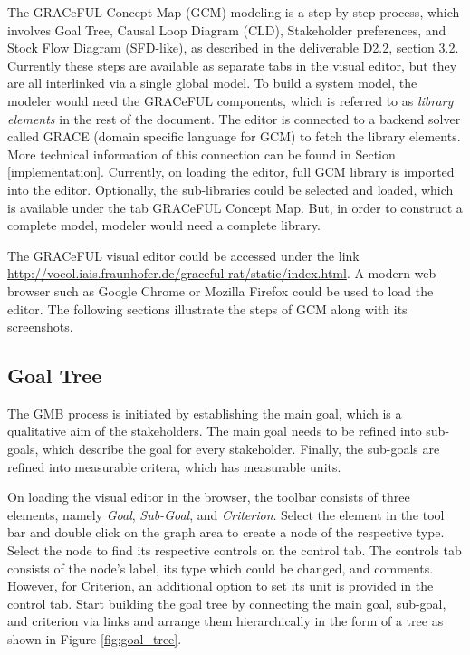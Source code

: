 \documentclass[a4paper]{article}
\begin{document}
The GRACeFUL Concept Map (GCM) modeling is a step-by-step process, which involves Goal Tree, Causal Loop Diagram (CLD), Stakeholder preferences, and Stock Flow Diagram (SFD-like), as described in the deliverable D2.2, section 3.2. Currently these steps are available as separate tabs in the visual editor, but they are all interlinked via a single global model. To build a system model, the modeler would need the GRACeFUL components, which is referred to as \textit{library elements} in the rest of the document. The editor is connected to a backend solver called GRACE (domain specific language for GCM) to fetch the library elements. More technical information of this connection can be found in Section \ref{implementation}. Currently, on loading the editor, full GCM library is imported into the editor. Optionally, the sub-libraries could be selected and loaded, which is available under the tab GRACeFUL Concept Map. But, in order to construct a complete model, modeler would need a complete library. 

The GRACeFUL visual editor could be accessed under the link \url{http://vocol.iais.fraunhofer.de/graceful-rat/static/index.html}. A modern web browser such as Google Chrome or Mozilla Firefox could be used to load the editor. The following sections illustrate the steps of GCM along with its screenshots.

\subsection{Goal Tree}

The GMB process is initiated by establishing the main goal, which is a qualitative aim of the stakeholders. The main goal needs to be refined into sub-goals, which describe the goal for every stakeholder. Finally, the sub-goals are refined into measurable critera, which has measurable units. 

On loading the visual editor in the browser, the toolbar consists of three elements, namely \textit{Goal}, \textit{Sub-Goal}, and \textit{Criterion}. Select the element in the tool bar and double click on the graph area to create a node of the respective type. Select the node to find its respective controls on the control tab. The controls tab consists of the node's label, its type which could be changed, and comments. However, for Criterion, an additional option to set its unit is provided in the control tab. Start building the goal tree by connecting the main goal, sub-goal, and criterion via links and arrange them hierarchically in the form of a tree as shown in Figure \ref{fig:goal_tree}. 
\end{document}
